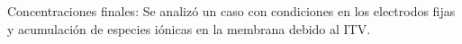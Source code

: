 \documentclass[a0,portrait]{a0poster}
\begin{document}
\begin{multicols}{2}
\begin{multicols}{2}

 Concentraciones finales: Se analizó un caso con condiciones en los electrodos fijas y acumulación de especies iónicas en la membrana debido al ITV.
 
\setlength{\columnseprule}{0pt}

\end{multicols}
\end{multicols}
\end{document}
